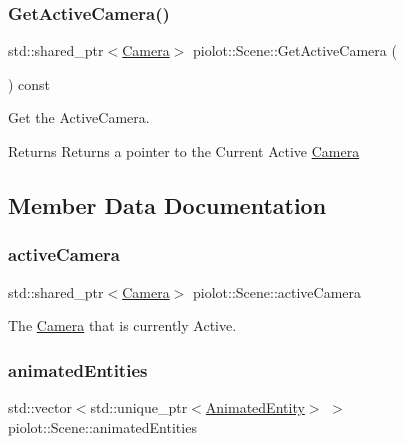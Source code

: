 \subsubsection{\texorpdfstring{Get\+Active\+Camera()}{GetActiveCamera()}}
{\footnotesize\ttfamily std\+::shared\+\_\+ptr$<$\mbox{\hyperlink{classpiolot_1_1_camera}{Camera}}$>$ piolot\+::\+Scene\+::\+Get\+Active\+Camera (\begin{DoxyParamCaption}{ }\end{DoxyParamCaption}) const\hspace{0.3cm}{\ttfamily [inline]}}



Get the Active\+Camera. 

\begin{DoxyReturn}{Returns}
Returns a pointer to the Current Active \mbox{\hyperlink{classpiolot_1_1_camera}{Camera}} 
\end{DoxyReturn}


\subsection{Member Data Documentation}
\mbox{\label{classpiolot_1_1_scene_a980ee452f49233f7b95fa4643e383ae9}} 
\subsubsection{\texorpdfstring{active\+Camera}{activeCamera}}
{\footnotesize\ttfamily std\+::shared\+\_\+ptr$<$\mbox{\hyperlink{classpiolot_1_1_camera}{Camera}}$>$ piolot\+::\+Scene\+::active\+Camera\hspace{0.3cm}{\ttfamily [protected]}}



The \mbox{\hyperlink{classpiolot_1_1_camera}{Camera}} that is currently Active. 

\mbox{\label{classpiolot_1_1_scene_a6253e5cbedc67830e76d6da04c0b4371}} 
\subsubsection{\texorpdfstring{animated\+Entities}{animatedEntities}}
{\footnotesize\ttfamily std\+::vector$<$std\+::unique\+\_\+ptr$<$\mbox{\hyperlink{classpiolot_1_1_animated_entity}{Animated\+Entity}}$>$ $>$ piolot\+::\+Scene\+::animated\+Entities\hspace{0.3cm}{\ttfamily [protected]}}



